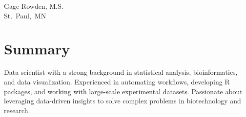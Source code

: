 \documentclass{resume}
\begin{document}
    \begin{header}

        \fontsize{25 pt}{25 pt}\selectfont Gage Rowden, M.S.\\
        \vspace{5 pt}
        \normalsize
        \mbox{St. Paul, MN}
        \AND
        \mbox{}
        \AND
        \mbox{}
        \AND
        \mbox{}
        \\%
        \mbox{}
        \AND
        \mbox{}

    \end{header}

    \vspace{5 pt - 0.3 cm}

    \section{Summary}

        Data scientist with a strong background in statistical analysis, bioinformatics, and data visualization. Experienced in automating workflows, developing R packages, and working with large-scale experimental datasets. Passionate about leveraging data-driven insights to solve complex problems in biotechnology and research.
    
\end{document}
